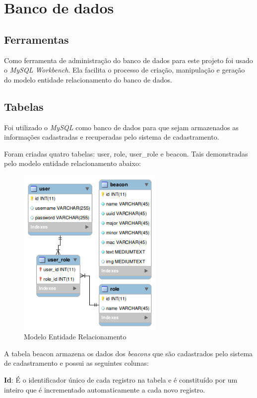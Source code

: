 \section{Banco de dados}

\subsection{Ferramentas}
Como ferramenta de administração do banco de dados para este projeto foi usado o \textit{MySQL Workbench}. Ela facilita o processo de criação, manipulação e geração do modelo entidade relacionamento do banco de dados.

\subsection{Tabelas}
Foi utilizado o \textit{MySQL} como banco de dados para que sejam armazenados as informações cadastradas e recuperadas pelo sistema de cadastramento. 

Foram criadas quatro tabelas: user, role, user\_role e beacon. Tais demonstradas pelo modelo entidade relacionamento abaixo:

\begin{figure}[H]
  \centering  
  \includegraphics[width=7cm]{./figs/mer.png}
  \caption{Modelo Entidade Relacionamento}
  \par{}
\end{figure}

A tabela beacon armazena os dados dos \textit{beacons} que são cadastrados pelo sistema de cadastramento e possui as seguintes colunas:

\textbf{Id}: É o identificador único de cada registro na tabela e é constituído por um inteiro que é incrementado automaticamente a cada novo registro.

